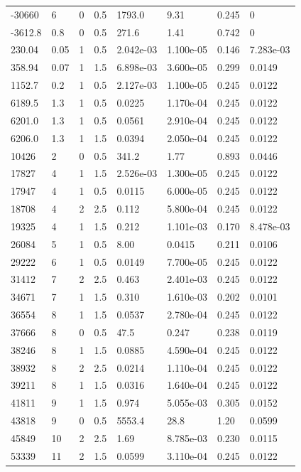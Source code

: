 \documentclass[preview]{standalone}
\begin{document}
{{\begin{tabular}{L{1.2cm}C{1.2cm} C{0.3cm}C{0.5cm} C{1.4cm}C{1.4cm} C{1.4cm}C{1.4cm}}
  -30660  &     6  & 0     & 0.5 &  1793.0  & 9.31  & 0.245 &  0   \\ 
  -3612.8  &   0.8  & 0     & 0.5 &  271.6  & 1.41  & 0.742 &  0   \\ 
  230.04  &  0.05  & 1     & 0.5 &  2.042e-03  & 1.100e-05  & 0.146 &  7.283e-03   \\ 
  358.94  &  0.07  & 1     & 1.5 &  6.898e-03  & 3.600e-05  & 0.299 &  0.0149   \\ 
  1152.7  &   0.2  & 1     & 0.5 &  2.127e-03  & 1.100e-05  & 0.245 &  0.0122   \\ 
  6189.5  &   1.3  & 1     & 0.5 &  0.0225  & 1.170e-04  & 0.245 &  0.0122   \\ 
  6201.0  &   1.3  & 1     & 0.5 &  0.0561  & 2.910e-04  & 0.245 &  0.0122   \\ 
  6206.0  &   1.3  & 1     & 1.5 &  0.0394  & 2.050e-04  & 0.245 &  0.0122   \\ 
  10426  &     2  & 0     & 0.5 &  341.2  & 1.77  & 0.893 &  0.0446   \\ 
  17827  &     4  & 1     & 1.5 &  2.526e-03  & 1.300e-05  & 0.245 &  0.0122   \\ 
  17947  &     4  & 1     & 0.5 &  0.0115  & 6.000e-05  & 0.245 &  0.0122   \\ 
  18708  &     4  & 2     & 2.5 &  0.112  & 5.800e-04  & 0.245 &  0.0122   \\ 
  19325  &     4  & 1     & 1.5 &  0.212  & 1.101e-03  & 0.170 &  8.478e-03   \\ 
  26084  &     5  & 1     & 0.5 &  8.00  & 0.0415  & 0.211 &  0.0106   \\ 
  29222  &     6  & 1     & 0.5 &  0.0149  & 7.700e-05  & 0.245 &  0.0122   \\ 
  31412  &     7  & 2     & 2.5 &  0.463  & 2.401e-03  & 0.245 &  0.0122   \\ 
  34671  &     7  & 1     & 1.5 &  0.310  & 1.610e-03  & 0.202 &  0.0101   \\ 
  36554  &     8  & 1     & 1.5 &  0.0537  & 2.780e-04  & 0.245 &  0.0122   \\ 
  37666  &     8  & 0     & 0.5 &  47.5  & 0.247  & 0.238 &  0.0119   \\ 
  38246  &     8  & 1     & 1.5 &  0.0885  & 4.590e-04  & 0.245 &  0.0122   \\ 
  38932  &     8  & 2     & 2.5 &  0.0214  & 1.110e-04  & 0.245 &  0.0122   \\ 
  39211  &     8  & 1     & 1.5 &  0.0316  & 1.640e-04  & 0.245 &  0.0122   \\ 
  41811  &     9  & 1     & 1.5 &  0.974  & 5.055e-03  & 0.305 &  0.0152   \\ 
  43818  &     9  & 0     & 0.5 &  5553.4  & 28.8  & 1.20 &  0.0599   \\ 
  45849  &    10  & 2     & 2.5 &  1.69  & 8.785e-03  & 0.230 &  0.0115   \\ 
  53339  &    11  & 2     & 1.5 &  0.0599  & 3.110e-04  & 0.245 &  0.0122   \\ 
\hline 
\end{tabular} 

}}
\end{document}
